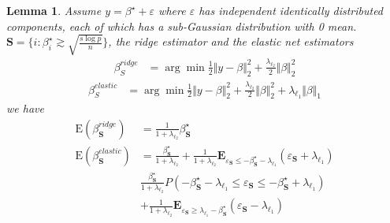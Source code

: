 \documentclass{article}
\newtheorem{lemma}{\textbf{Lemma}}\newtheorem{theorem}{\textbf{Theorem}}\usepackage{algorithmic}
\begin{document}
\begin{lemma} \label{lemma:bias-ridge-elastic} Assume $y=\beta^{\star}+\varepsilon$
where $\varepsilon$ has independent identically distributed components,
each of which has a sub-Gaussian distribution with 0 mean. $\mathbf{S}=\{i:\beta_{i}^{\star}\gtrsim\sqrt{\frac{s\log{p}}{n}}\}$,
the ridge estimator and the elastic net estimators
\begin{align}
\beta_{S}^{ridge} & =\arg\min\frac{1}{2}\Vert y-\beta\Vert_{2}^{2}+\frac{\lambda_{\ell_{2}}}{2}\Vert\beta\Vert_{2}^{2}\label{eq:estimators}
\end{align}
\begin{align}
\beta_{S}^{elastic} & =\arg\min\frac{1}{2}\Vert y-\beta\Vert_{2}^{2}+\frac{\lambda_{\ell_{2}}}{2}\Vert\beta\Vert_{2}^{2}+\lambda_{\ell_{1}}\Vert\beta\Vert_{1}
\end{align}
we have
\begin{align}
\mathrm{E}(\beta_{\mathbf{S}}^{ridge}) & =\frac{1}{1+\lambda_{\ell_{2}}}\beta_{\mathbf{S}}^{\star}\label{eq:bias-ridge}\\
\mathrm{E}(\beta_{\mathbf{S}}^{elastic}) & =\frac{\beta_{\mathbf{S}}^{\star}}{1+\lambda_{\ell_{2}}}+\frac{1}{1+\lambda_{\ell_{2}}}\mathbf{E}_{\varepsilon_{\mathbf{S}}\leq-\beta_{\mathbf{S}}^{\star}-\lambda_{\ell_{1}}}(\varepsilon_{\mathbf{S}}+\lambda_{\ell_{1}})\nonumber \\
 & \frac{\beta_{\mathbf{S}}^{\star}}{1+\lambda_{\ell_{2}}}P(-\beta_{\mathbf{S}}^{\star}-\lambda_{\ell_{1}}\leq\varepsilon_{\mathbf{S}}\leq-\beta_{\mathbf{S}}^{\star}+\lambda_{\ell_{1}})\nonumber \\
 & +\frac{1}{1+\lambda_{\ell_{2}}}\mathbf{E}_{\varepsilon_{\mathbf{S}}\geq\lambda_{\ell_{1}}-\beta_{\mathbf{S}}^{\star}}(\varepsilon_{\mathbf{S}}-\lambda_{\ell_{1}})\label{eq:bias-elastic}
\end{align}
\end{lemma}
\end{document}
